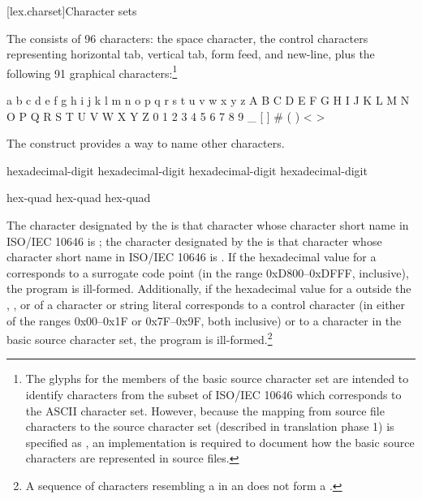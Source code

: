 [lex.charset]{Character sets}

\pnum
{}%
The  consists of 96 characters: the space character,
the control characters representing horizontal tab, vertical tab, form feed, and
new-line, plus the following 91 graphical characters:\footnote{The glyphs for
the members of the basic source character set are intended to
identify characters from the subset of ISO/IEC 10646 which corresponds to the ASCII
character set. However, because the mapping from source file characters to the source
character set (described in translation phase 1) is specified as
,
an implementation is required to document how the basic source characters are
represented in source files.}
\begin{codeblock}
a b c d e f g h i j k l m n o p q r s t u v w x y z
A B C D E F G H I J K L M N O P Q R S T U V W X Y Z
0 1 2 3 4 5 6 7 8 9
_ { } [ ] # ( ) < > %
\end{codeblock}

\pnum
The  construct provides a way to name
other characters.

\begin{bnf}
\br
    hexadecimal-digit hexadecimal-digit hexadecimal-digit hexadecimal-digit
\end{bnf}

\begin{bnf}
\br
     hex-quad\br
     hex-quad hex-quad
\end{bnf}

The character designated by the   is that character whose character short name in ISO/IEC 10646 is
; the character designated by the 
 is that character whose character short name in
ISO/IEC 10646 is . If the hexadecimal value for a
 corresponds to a surrogate code point (in the
range 0xD800--0xDFFF, inclusive), the program is ill-formed. Additionally, if
the hexadecimal value for a  outside
the , , or
 of
a character or
string literal corresponds to a control character (in either of the
ranges 0x00--0x1F or 0x7F--0x9F, both inclusive) or to a character in the basic
source character set, the program is ill-formed.\footnote{A sequence of characters resembling a  in an
 does not form a
.}

